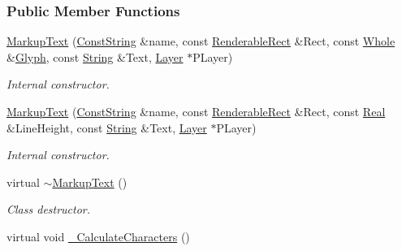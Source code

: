 \subsubsection*{Public Member Functions}
\begin{DoxyCompactItemize}
\item 
\hyperlink{classMezzanine_1_1UI_1_1MarkupText_a6cb716e035363adc93f2213b74c8fcb2}{MarkupText} (\hyperlink{namespaceMezzanine_a63cd699ac54b73953f35ec9cfc05e506}{ConstString} \&name, const \hyperlink{structMezzanine_1_1UI_1_1RenderableRect}{RenderableRect} \&Rect, const \hyperlink{namespaceMezzanine_adcbb6ce6d1eb4379d109e51171e2e493}{Whole} \&\hyperlink{classMezzanine_1_1UI_1_1Glyph}{Glyph}, const \hyperlink{namespaceMezzanine_acf9fcc130e6ebf08e3d8491aebcf1c86}{String} \&Text, \hyperlink{classMezzanine_1_1UI_1_1Layer}{Layer} $\ast$PLayer)
\begin{DoxyCompactList}\small\item\em Internal constructor. \item\end{DoxyCompactList}\item 
\hyperlink{classMezzanine_1_1UI_1_1MarkupText_a98467ecf78d53e9497cb6aeb0da27edd}{MarkupText} (\hyperlink{namespaceMezzanine_a63cd699ac54b73953f35ec9cfc05e506}{ConstString} \&name, const \hyperlink{structMezzanine_1_1UI_1_1RenderableRect}{RenderableRect} \&Rect, const \hyperlink{namespaceMezzanine_a726731b1a7df72bf3583e4a97282c6f6}{Real} \&LineHeight, const \hyperlink{namespaceMezzanine_acf9fcc130e6ebf08e3d8491aebcf1c86}{String} \&Text, \hyperlink{classMezzanine_1_1UI_1_1Layer}{Layer} $\ast$PLayer)
\begin{DoxyCompactList}\small\item\em Internal constructor. \item\end{DoxyCompactList}\item 
\hypertarget{classMezzanine_1_1UI_1_1MarkupText_a4b67b1166278d87bb7b38fdfbc3577fe}{
virtual \hyperlink{classMezzanine_1_1UI_1_1MarkupText_a4b67b1166278d87bb7b38fdfbc3577fe}{$\sim$MarkupText} ()}
\label{classMezzanine_1_1UI_1_1MarkupText_a4b67b1166278d87bb7b38fdfbc3577fe}

\begin{DoxyCompactList}\small\item\em Class destructor. \item\end{DoxyCompactList}\item 
\hypertarget{classMezzanine_1_1UI_1_1MarkupText_a4402248adaa42ffb23f18dedb73e2d36}{
virtual void \hyperlink{classMezzanine_1_1UI_1_1MarkupText_a4402248adaa42ffb23f18dedb73e2d36}{\_\-CalculateCharacters} ()}
\label{classMezzanine_1_1UI_1_1MarkupText_a4402248adaa42ffb23f18dedb73e2d36}


\end{DoxyCompactItemize}
